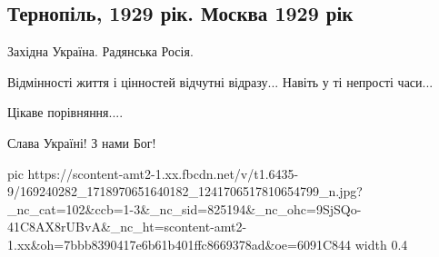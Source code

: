  
 
 
 
 

\subsection{Тернопіль, 1929 рік. Москва 1929 рік}
\label{sec:05_04_2021.fb.martynenko_alexander.1.moskva_ternopil_1929_cennosti}

Західна Україна. Радянська Росія.

Відмінності життя і цінностей відчутні відразу... Навіть у ті непрості часи...

Цікаве порівняння.... 

Слава Україні! З нами Бог!

\ifcmt
  pic https://scontent-amt2-1.xx.fbcdn.net/v/t1.6435-9/169240282_1718970651640182_1241706517810654799_n.jpg?_nc_cat=102&ccb=1-3&_nc_sid=825194&_nc_ohc=9SjSQo-41C8AX8rUBvA&_nc_ht=scontent-amt2-1.xx&oh=7bbb8390417e6b61b401ffc8669378ad&oe=6091C844
  width 0.4
\fi

